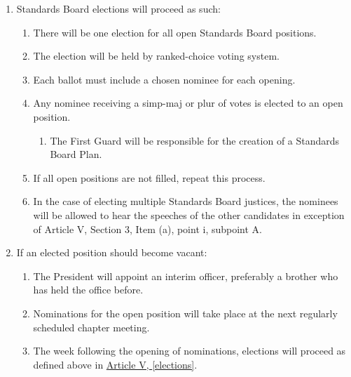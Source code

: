 \begin{enumerate}
\begin{enumerate}
			\end{enumerate}
    \item Standards Board elections will proceed as such:
        \begin{enumerate}
            \item There will be one election for all open Standards Board positions.
	    \item The election will be held by \gls{ranked-choice} voting system.
            \item Each ballot must include a chosen nominee for each opening.
            \item Any nominee receiving a \gls{simp-maj} or \gls{plur} of votes is elected to an open position.
	    	\begin{enumerate}
			\item The First Guard will be responsible for the creation of a Standards Board Plan.
		\end{enumerate}
            \item If all open positions are not filled, repeat this process.
            \item In the case of electing multiple Standards Board justices, the nominees will be allowed to hear the speeches of the other candidates in exception of Article V, Section 3, Item (a), point i, subpoint A.
        \end{enumerate}
    \item If an elected position should become vacant:
			\begin{enumerate}
				\item The President will appoint an interim officer, preferably a brother who has held the office before.
				\item Nominations for the open position will take place at the next regularly scheduled chapter meeting.
				\item The week following the opening of nominations, elections will proceed as defined above in \hyperref[elections]{Article V, \autoref*{elections}}.
			\end{enumerate}
	\end{enumerate}

